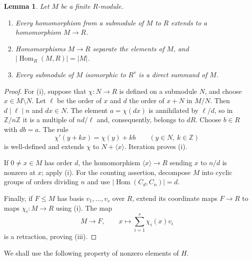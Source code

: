 \documentclass[10pt,a4paper]{amsart}
\newtheorem{lemma}[theorem]{Lemma}
\numberwithin{equation}{section}
\newcommand{\Hom}{\operatorname{Hom}}
\newcommand{\Z}{\mathbb{Z}}
\renewcommand{\leq}{\leqslant}
\begin{document}
\begin{lemma}\label{lem:characters}
Let $M$ be a finite $R$-module.
\begin{enumerate}[label=\textup{(\roman*)},leftmargin=2.4em]
\item Every homomorphism from a submodule of $M$ to $R$ extends to a homomorphism $M\to R$.
\item Homomorphisms $M\to R$ separate the elements of $M$, and $|\Hom_R(M,R)|=|M|$.
\item Every submodule of $M$ isomorphic to $R^s$ is a direct summand of $M$.
\end{enumerate}
\end{lemma}
\begin{proof}
For (i), suppose that $\chi:N\to R$ is defined on a submodule $N$, and choose $x\in M\setminus N$. Let $\ell$ be the order of $x$ and $d$ the order of $x+N$ in $M/N$. Then $d\mid\ell\mid n$ and $dx\in N$. The element $a=\chi(dx)$ is annihilated by $\ell/d$, so in $\Z/n\Z$ it is a multiple of $nd/\ell$ and, consequently, belongs to $dR$. Choose $b\in R$ with $db=a$. The rule
\[
 \chi'(y+kx)=\chi(y)+kb\qquad(y\in N,\ k\in\Z)
\]
is well-defined and extends $\chi$ to $N+\langle x\rangle$. Iteration proves (i).

If $0\ne x\in M$ has order $d$, the homomorphism $\langle x\rangle\to R$ sending $x$ to $n/d$ is nonzero at $x$; apply (i). For the counting assertion, decompose $M$ into cyclic groups of orders dividing $n$ and use $|\Hom(C_d,C_n)|=d$.

Finally, if $F\leq M$ has basis $v_1,\ldots,v_s$ over $R$, extend its coordinate maps $F\to R$ to maps $\chi_i:M\to R$ using (i). The map
\[
 M\longrightarrow F,\qquad x\longmapsto\sum_{i=1}^{s}\chi_i(x)v_i
\]
is a retraction, proving (iii).
\end{proof}

We shall use the following property of nonzero elements of $H$.
\end{document}
